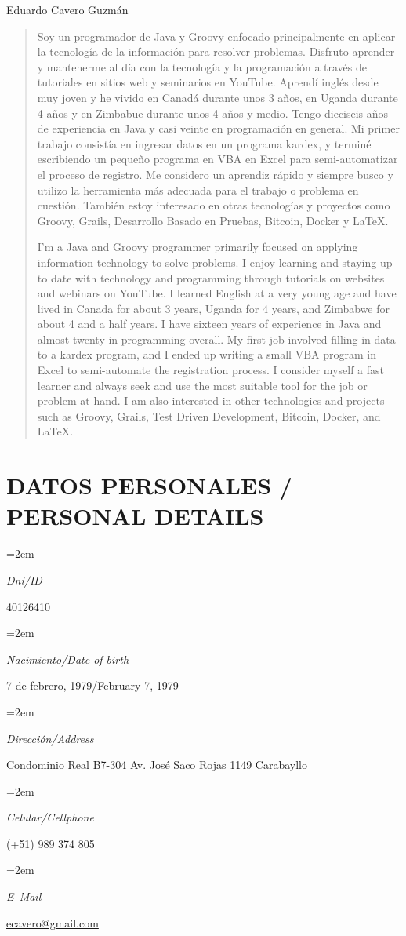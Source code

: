 \documentclass[paper=a4,fontsize=11pt]{scrartcl} %
\newlength{\spacebox}
\newcommand{\sepspace}{\vspace*{1em}}		%
\newcommand{\MyName}[1]{ %
		\Huge \usefont{OT1}{phv}{b}{n} \hfill #1
		\par \normalsize \normalfont}
\newcommand{\NewPart}[1]{\section*{\uppercase{#1}}}
\newcommand{\PersonalEntry}[2]{
		\noindent\hangindent=2em\hangafter=0 %
		\parbox{\spacebox}{        %
		\textit{#1}}		       %
		\hspace{4em} #2 \par}    %
\begin{document}
\begin{center}
\end{center}


\MyName{Eduardo Cavero Guzmán}
\sepspace

\begin{abstract}

Soy un programador de Java y Groovy enfocado principalmente en aplicar la tecnología de la información para resolver problemas. 
Disfruto aprender y mantenerme al día con la tecnología y la programación a través de tutoriales en sitios web y seminarios en YouTube. 
Aprendí inglés desde muy joven y he vivido en Canadá durante unos 3 años, en Uganda durante 4 años y en Zimbabue durante unos 4 años y medio. 
Tengo dieciseis años de experiencia en Java y casi veinte en programación en general. Mi primer trabajo consistía en ingresar datos en un programa kardex, 
y terminé escribiendo un pequeño programa en VBA en Excel para semi-automatizar el proceso de registro. 
Me considero un aprendiz rápido y siempre busco y utilizo la herramienta más adecuada para el trabajo o problema en cuestión. 
También estoy interesado en otras tecnologías y proyectos como Groovy, Grails, Desarrollo Basado en Pruebas, Bitcoin, Docker y LaTeX.

\sepspace

I’m a Java and Groovy programmer primarily focused on applying information technology to solve problems. 
I enjoy learning and staying up to date with technology and programming through tutorials on websites and webinars on YouTube. 
I learned English at a very young age and have lived in Canada for about 3 years, Uganda for 4 years, and Zimbabwe for about 4 and a half years. 
I have sixteen years of experience in Java and almost twenty in programming overall. My first job involved filling in data to a kardex program, 
and I ended up writing a small VBA program in Excel to semi-automate the registration process. 
I consider myself a fast learner and always seek and use the most suitable tool for the job or problem at hand. 
I am also interested in other technologies and projects such as Groovy, Grails, Test Driven Development, Bitcoin, Docker, and LaTeX.
\end{abstract}


\NewPart{Datos personales / Personal Details}{}

\PersonalEntry{Dni/ID}{40126410}
\PersonalEntry{Nacimiento/Date of birth}{7 de febrero, 1979/February 7, 1979}
\PersonalEntry{Dirección/Address}{Condominio Real B7-304 Av. José Saco Rojas 1149 Carabayllo}
\PersonalEntry{Celular/Cellphone}{(+51) 989 374 805}
\PersonalEntry{E--Mail}{\url{ecavero@gmail.com}}
\end{document}
